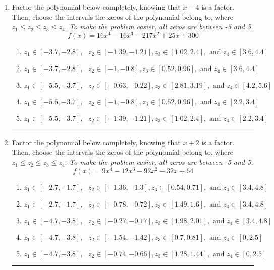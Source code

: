 \documentclass[14pt]{extbook}
\newcommand{\litem}[1]{\item#1\hspace*{-1cm}\rule{\textwidth}{0.4pt}}
\begin{document}
\begin{enumerate}
{\begin{enumerate}[label=\Alph*.]
\end{enumerate} }
\litem{
Factor the polynomial below completely, knowing that $x -4$ is a factor. Then, choose the intervals the zeros of the polynomial belong to, where $z_1 \leq z_2 \leq z_3 \leq z_4$. \textit{To make the problem easier, all zeros are between -5 and 5.}\[ f(x) = 16x^{4} -16 x^{3} -217 x^{2} +25 x + 300 \]\begin{enumerate}[label=\Alph*.]
\item \( z_1 \in [-3.7, -2.8], \text{   }  z_2 \in [-1.39, -1.21], z_3 \in [1.02, 2.4], \text{   and   } z_4 \in [3.6, 4.4] \)
\item \( z_1 \in [-3.7, -2.8], \text{   }  z_2 \in [-1, -0.8], z_3 \in [0.52, 0.96], \text{   and   } z_4 \in [3.6, 4.4] \)
\item \( z_1 \in [-5.5, -3.7], \text{   }  z_2 \in [-0.63, -0.22], z_3 \in [2.81, 3.19], \text{   and   } z_4 \in [4.2, 5.6] \)
\item \( z_1 \in [-5.5, -3.7], \text{   }  z_2 \in [-1, -0.8], z_3 \in [0.52, 0.96], \text{   and   } z_4 \in [2.2, 3.4] \)
\item \( z_1 \in [-5.5, -3.7], \text{   }  z_2 \in [-1.39, -1.21], z_3 \in [1.02, 2.4], \text{   and   } z_4 \in [2.2, 3.4] \)

\end{enumerate} }
\litem{
Factor the polynomial below completely, knowing that $x + 2$ is a factor. Then, choose the intervals the zeros of the polynomial belong to, where $z_1 \leq z_2 \leq z_3 \leq z_4$. \textit{To make the problem easier, all zeros are between -5 and 5.}\[ f(x) = 9x^{4} -12 x^{3} -92 x^{2} -32 x + 64 \]\begin{enumerate}[label=\Alph*.]
\item \( z_1 \in [-2.7, -1.7], \text{   }  z_2 \in [-1.36, -1.3], z_3 \in [0.54, 0.71], \text{   and   } z_4 \in [3.4, 4.8] \)
\item \( z_1 \in [-2.7, -1.7], \text{   }  z_2 \in [-0.78, -0.72], z_3 \in [1.49, 1.6], \text{   and   } z_4 \in [3.4, 4.8] \)
\item \( z_1 \in [-4.7, -3.8], \text{   }  z_2 \in [-0.27, -0.17], z_3 \in [1.98, 2.01], \text{   and   } z_4 \in [3.4, 4.8] \)
\item \( z_1 \in [-4.7, -3.8], \text{   }  z_2 \in [-1.54, -1.42], z_3 \in [0.7, 0.81], \text{   and   } z_4 \in [0, 2.5] \)
\item \( z_1 \in [-4.7, -3.8], \text{   }  z_2 \in [-0.74, -0.66], z_3 \in [1.28, 1.44], \text{   and   } z_4 \in [0, 2.5] \)


\end{enumerate}}
\end{enumerate}
\end{document}

